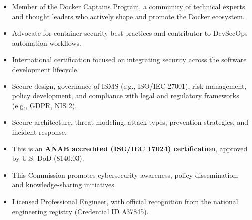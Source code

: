 \iflongversion

	\begin{itemize}
		\item Member of the Docker Captains Program, a community of technical experts and thought leaders who actively shape and promote the Docker ecosystem.
		\item Advocate for container security best practices and contributor to DevSecOps automation workflows.
	\end{itemize}

	\medskip

	\begin{itemize}
		\item International certification focused on integrating security across the software development lifecycle.
		\item Secure design, governance of ISMS (e.g., ISO/IEC 27001), risk management, policy development, and compliance with legal and regulatory frameworks (e.g., GDPR, NIS 2).
		\item Secure architecture, threat modeling, attack types, prevention strategies, and incident response.
		\item This is an \textbf {ANAB accredited (ISO/IEC 17024) certification}, approved by U.S. DoD (8140.03).
	\end{itemize}

	\medskip

	\begin{itemize}
		\item This Commission promotes cybersecurity awareness, policy dissemination, and knowledge-sharing initiatives.
	\end{itemize}

	\begin{itemize}
		\item Licensed Professional Engineer, with official recognition from the national engineering registry (Credential ID A37845).
	\end{itemize}
\fi


\iflongversion

